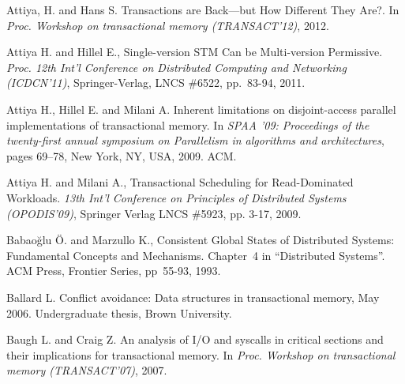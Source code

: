 \begin{thebibliography}{99}
{
Attiya, H. and Hans S.
\newblock Transactions are Back---but How Different They Are?.
\newblock In {\em Proc. Workshop on transactional memory (TRANSACT'12)}, 2012.



Attiya  H. and Hillel E.,
Single-version STM Can be Multi-version Permissive. 
{\it Proc. 12th Int'l Conference on Distributed Computing and Networking
(ICDCN'11)}, Springer-Verlag, LNCS \#6522, pp.~83-94, 2011.


Attiya H., Hillel E. and Milani A.
\newblock Inherent limitations on disjoint-access parallel implementations of
  transactional memory.
\newblock In {\em SPAA '09: Proceedings of the twenty-first annual symposium on
  Parallelism in algorithms and architectures}, pages 69--78, New York, NY,
  USA, 2009. ACM.




Attiya H. and Milani A., 
Transactional Scheduling for Read-Dominated Workloads. 
{\it 13th Int'l Conference on  Principles of Distributed Systems
(OPODIS'09)},  Springer Verlag  LNCS \#5923, pp. 3-17, 2009. 









Babao\u{g}lu \"{O}. and Marzullo K., 
Consistent Global States of Distributed Systems: Fundamental
Concepts and Mechanisms. Chapter~4 in ``Distributed Systems''.  
ACM Press, Frontier Series,  pp~55-93, 1993.


Ballard L.
\newblock Conflict avoidance: Data structures in transactional memory, May
  2006.
\newblock Undergraduate thesis, Brown University.



Baugh L. and Craig Z.
An analysis of I/O and syscalls in critical sections and their implications for transactional memory.
\newblock In {\em Proc. Workshop on transactional memory (TRANSACT'07)}, 2007.


}
\end{thebibliography}
